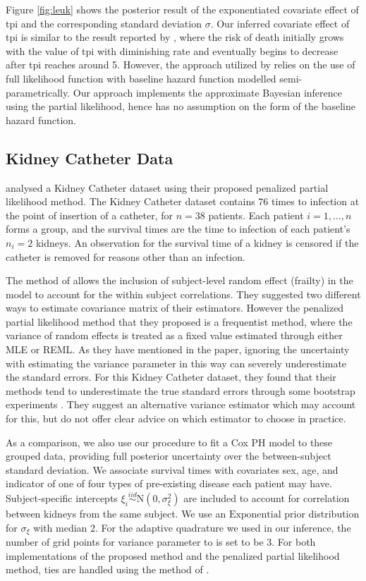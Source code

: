\documentclass[ba]{imsart}
\begin{document}
Figure \ref{fig:leuk} shows the posterior result of the exponentiated covariate effect of tpi and the corresponding standard deviation $\sigma$. Our inferred covariate effect of tpi is similar to the result reported by \cite{inlacoxph}, where the risk of death initially grows with the value of tpi with diminishing rate and eventually begins to decrease after tpi reaches around 5. However, the approach utilized by \cite{inlacoxph} relies on the use of full likelihood function with baseline hazard function modelled semi-parametrically. Our approach implements the approximate Bayesian inference using the partial likelihood, hence has no assumption on the form of the baseline hazard function. 


\subsection{Kidney Catheter Data}\label{subsec:kidney}

\cite{freqPL} analysed a Kidney Catheter dataset using their proposed penalized partial likelihood method. The Kidney Catheter dataset contains 76 times to infection at the point of insertion of a catheter, for $n = 38$ patients. Each patient $i=1,\ldots,n$ forms a group, and the survival times are the time to infection of each patient's $n_{i} = 2$ kidneys. An observation for the survival time of a kidney is censored if the catheter is removed for reasons other than an infection. 

The method of \cite{freqPL} allows the inclusion of subject-level random effect (frailty) in the model to account for the within subject correlations. They suggested two different ways to estimate covariance matrix of their estimators. However the penalized partial likelihood method that they proposed is a frequentist method, where the variance of random effects is treated as a fixed value estimated through either MLE or REML. As they have mentioned in the paper, ignoring the uncertainty with estimating the variance parameter in this way can severely underestimate the standard errors. For this Kidney Catheter dataset, they found that their methods tend to underestimate the true standard errors through some bootstrap experiments \citep{freqPL}. They suggest an alternative variance estimator which may account for this, but do not offer clear advice on which estimator to choose in practice.

As a comparison, we also use our procedure to fit a Cox PH model to these grouped data, providing full posterior uncertainty over the between-subject standard deviation. We associate survival times with covariates sex, age, and indicator of one of four types of pre-existing disease each patient may have. Subject-specific intercepts $\xi_{i}\overset{iid}{\sim}\text{N}(0,\sigma^{2}_{\xi})$ are included to account for correlation between kidneys from the same subject. We use an $\text{Exponential}$ prior distribution for $\sigma_{\xi}$ with median 2. For the adaptive quadrature we used in our inference, the number of grid points for variance parameter to is set to be 3. For both implementations of the proposed method and the penalized partial likelihood method, ties are handled using the method of \cite{Breslow}.
\end{document}
